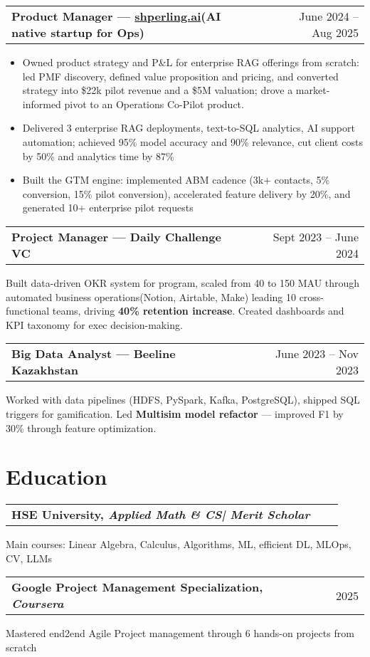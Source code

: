 \documentclass[a4paper,12pt]{article}
\makeatletter
\newenvironment{jobshort}[2]
    {
    \begin{tabularx}{\linewidth}{@{}l X r@{}}
    \textbf{#1} & \hfill &  #2 \\[0.25pt]
    \end{tabularx}
    }
    {
    }
\newenvironment{joblong}[2]
    {
    \begin{tabularx}{\linewidth}{@{}l X r@{}}
    \textbf{#1} & \hfill &  #2 \\[0.25pt]
    \end{tabularx}
    \begin{minipage}[t]{\linewidth}
    \begin{itemize}[leftmargin=1em,label=--]
    }
    {
    \end{itemize}
    \end{minipage}    
    }
\makeatother
\begin{document}
\begin{joblong}{Product Manager — \href{https://shperling.ai}{shperling.ai}(AI native startup for Ops)}{June 2024 – Aug 2025}
\item Owned product strategy and P\&L for enterprise RAG offerings from scratch: led PMF discovery, defined value proposition and pricing, and converted strategy into \$22k pilot revenue and a \$5M valuation; drove a market-informed pivot to an Operations Co-Pilot product.
\item Delivered 3 enterprise RAG deployments, text-to-SQL analytics, AI support automation; achieved 95\% model accuracy and 90\% relevance, cut client costs by 50\+\% and analytics time by 87\%
\item Built the GTM engine: implemented ABM cadence (3k+ contacts, 5\% conversion, 15\% pilot conversion), accelerated feature delivery by 20\%, and generated 10+ enterprise pilot requests
\end{joblong}


\begin{jobshort}{Project Manager — Daily Challenge VC}{Sept 2023 – June 2024}
Built data-driven OKR system for program, scaled from 40 to 150 MAU through automated business operations(Notion, Airtable, Make) leading 10 cross-functional teams, driving \textbf{40\% retention increase}. Created dashboards and KPI taxonomy for exec decision-making.
\end{jobshort}


\begin{jobshort}{Big Data Analyst — Beeline Kazakhstan}{June 2023 – Nov 2023}
Worked with data pipelines (HDFS, PySpark, Kafka, PostgreSQL), shipped SQL triggers for gamification. Led \textbf{Multisim model refactor} — improved F1 by 30\% through feature optimization.
\end{jobshort}
\section{Education}
\begin{jobshort}{HSE University, \textit{Applied Math \& CS| Merit Scholar}}{}
\end{jobshort}
\noindent Main courses: Linear Algebra, Calculus, Algorithms, ML, efficient DL, MLOps, CV, LLMs

\begin{jobshort}{Google Project Management Specialization, \textit{Coursera}}{2025}
\end{jobshort}
\noindent Mastered end2end Agile Project management through 6 hands-on projects from scratch
\end{document}
